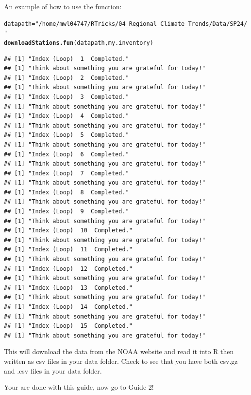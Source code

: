 \documentclass{article}\usepackage[]{graphicx}\usepackage[dvipsnames]{xcolor}
\makeatletter
\newcommand{\hlstr}[1]{\textcolor[rgb]{0.192,0.494,0.8}{#1}}%
\newcommand{\hlstd}[1]{\textcolor[rgb]{0.345,0.345,0.345}{#1}}%
\newcommand{\hlkwb}[1]{\textcolor[rgb]{0.69,0.353,0.396}{#1}}%
\newcommand{\hlkwd}[1]{\textcolor[rgb]{0.737,0.353,0.396}{\textbf{#1}}}%
\newenvironment{kframe}{%
 \def\at@end@of@kframe{}%
 \ifinner\ifhmode%
  \def\at@end@of@kframe{\end{minipage}}%
  \begin{minipage}{\columnwidth}%
 \fi\fi%
 \def\FrameCommand##1{\hskip\@totalleftmargin \hskip-\fboxsep
 \colorbox{shadecolor}{##1}\hskip-\fboxsep
     \hskip-\linewidth \hskip-\@totalleftmargin \hskip\columnwidth}%
 \MakeFramed {\advance\hsize-\width
   \@totalleftmargin\z@ \linewidth\hsize
   \@setminipage}}%
 {\par\unskip\endMakeFramed%
 \at@end@of@kframe}
\newenvironment{knitrout}{}{} %
\makeatother
\begin{document}
\begin{description}
An example of how to use the function: 

\begin{knitrout}
\color{fgcolor}\begin{kframe}
\begin{alltt}
\hlstd{datapath} \hlkwb{=} \hlstr{"/home/mwl04747/RTricks/04_Regional_Climate_Trends/Data/SP24/"}
\hlkwd{downloadStations.fun}\hlstd{(datapath, my.inventory)}
\end{alltt}
\begin{verbatim}
## [1] "Index (Loop)  1  Completed."
## [1] "Think about something you are grateful for today!"
## [1] "Index (Loop)  2  Completed."
## [1] "Think about something you are grateful for today!"
## [1] "Index (Loop)  3  Completed."
## [1] "Think about something you are grateful for today!"
## [1] "Index (Loop)  4  Completed."
## [1] "Think about something you are grateful for today!"
## [1] "Index (Loop)  5  Completed."
## [1] "Think about something you are grateful for today!"
## [1] "Index (Loop)  6  Completed."
## [1] "Think about something you are grateful for today!"
## [1] "Index (Loop)  7  Completed."
## [1] "Think about something you are grateful for today!"
## [1] "Index (Loop)  8  Completed."
## [1] "Think about something you are grateful for today!"
## [1] "Index (Loop)  9  Completed."
## [1] "Think about something you are grateful for today!"
## [1] "Index (Loop)  10  Completed."
## [1] "Think about something you are grateful for today!"
## [1] "Index (Loop)  11  Completed."
## [1] "Think about something you are grateful for today!"
## [1] "Index (Loop)  12  Completed."
## [1] "Think about something you are grateful for today!"
## [1] "Index (Loop)  13  Completed."
## [1] "Think about something you are grateful for today!"
## [1] "Index (Loop)  14  Completed."
## [1] "Think about something you are grateful for today!"
## [1] "Index (Loop)  15  Completed."
## [1] "Think about something you are grateful for today!"
\end{verbatim}
\end{kframe}
\end{knitrout}

This will download the data from the NOAA website and read it into R then written as csv files in your data folder. Check to see that you have both csv.gz and .csv files in your data folder.

\end{description}

\LARGE\textcolor{LightRubineRed}{Your are done with this guide, now go to Guide 2!}
\end{document}
